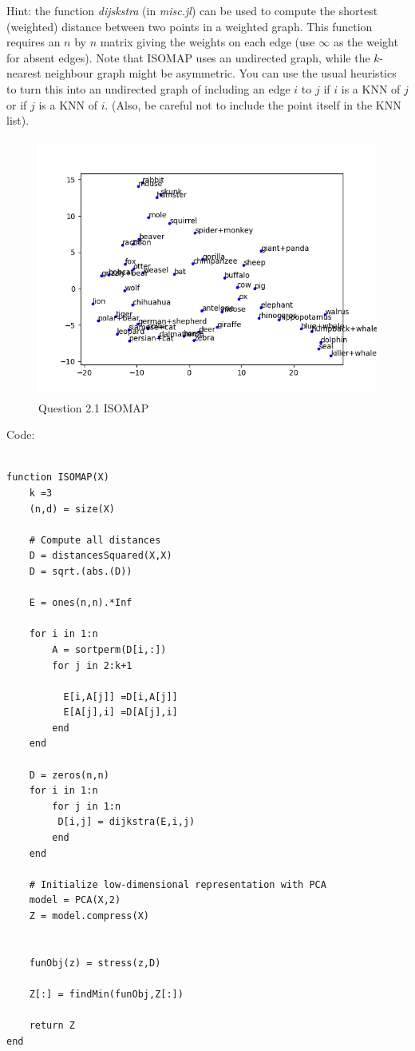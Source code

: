 \documentclass{article}
\begin{document}
Hint: the function \emph{dijskstra} (in \emph{misc.jl}) can be used to compute the shortest (weighted) distance between two points in a weighted graph. This function requires an $n$ by $n$ matrix giving the weights on each edge (use $\infty$ as the weight for absent edges). Note that ISOMAP uses an undirected graph, while the $k$-nearest neighbour graph might be asymmetric. You can use the usual heuristics to turn this into an undirected graph of including an edge $i$ to $j$ if $i$ is a KNN of $j$ or if $j$ is a KNN of $i$. (Also, be careful not to include the point itself in the KNN list).


\begin{figure}[h!]
    \includegraphics[width=50em,height=8.5cm]{q2_1.png}
    \caption{Question 2.1 ISOMAP}
    \label{fig:q2_1}
\end{figure}

Code:
\begin{verbatim}

function ISOMAP(X)
    k =3
    (n,d) = size(X)

    # Compute all distances
    D = distancesSquared(X,X)
    D = sqrt.(abs.(D))

    E = ones(n,n).*Inf

    for i in 1:n
        A = sortperm(D[i,:])
        for j in 2:k+1
          
          E[i,A[j]] =D[i,A[j]]
          E[A[j],i] =D[A[j],i]     
        end 
    end

    D = zeros(n,n)
    for i in 1:n
        for j in 1:n
         D[i,j] = dijkstra(E,i,j)
        end
    end

    # Initialize low-dimensional representation with PCA
    model = PCA(X,2)
    Z = model.compress(X)
    

    funObj(z) = stress(z,D)

    Z[:] = findMin(funObj,Z[:])

    return Z
end

\end{verbatim}
\end{document}
